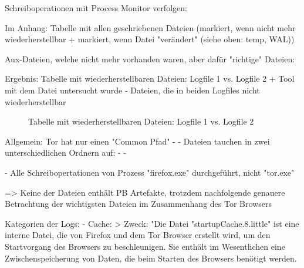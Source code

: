 Schreiboperationen mit Process Monitor verfolgen:

Im Anhang: Tabelle mit allen geschriebenen Dateien (markiert, wenn nicht mehr wiederherstellbar + markiert, wenn Datei "verändert" (siehe oben: temp, WAL))

Aux-Dateien, welche nicht mehr vorhanden waren, aber dafür "richtige" Dateien:

Ergebnis: Tabelle mit wiederherstellbaren Dateien: Logfile 1 vs. Logfile 2 + Tool mit dem Datei untersucht wurde
- Dateien, die in beiden Logfiles nicht wiederherstellbar 
\begin{figure}[h!]
	\caption{Tabelle mit wiederherstellbaren Dateien: Logfile 1 vs. Logfile 2}
\end{figure}

Allgemein: Tor hat nur einen "Common Pfad"
-	%
- Dateien tauchen in zwei unterschiedlichen Ordnern auf:
	- %
	- %

- Alle Schreibopertationen von Prozess "firefox.exe" durchgeführt, nicht "tor.exe" 

=> Keine der Dateien enthält PB Artefakte, trotzdem nachfolgende genauere Betrachtung der wichtigsten Dateien im Zusammenhang des Tor Browsers

Kategorien der Logs:
- Cache: 
	> %
	Zweck:
		"Die Datei "startupCache.8.little" ist eine interne Datei, die von Firefox und dem Tor Browser erstellt wird, um den Startvorgang des Browsers zu beschleunigen. Sie enthält im Wesentlichen eine Zwischenspeicherung von Daten, die beim Starten des Browsers benötigt werden.

